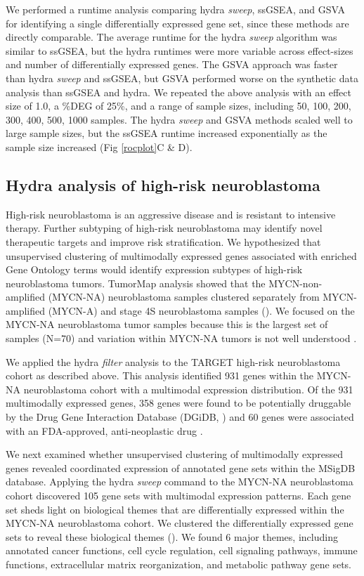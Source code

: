 \documentclass[10pt,letterpaper]{article}
\begin{document}
We performed a runtime analysis comparing hydra \textit{sweep}, ssGSEA, and GSVA for identifying a single differentially expressed gene set, since these methods are directly comparable. The average runtime for the hydra \textit{sweep} algorithm was similar to ssGSEA, but the hydra runtimes were more variable across effect-sizes and number of differentially expressed genes. The GSVA approach was faster than hydra \textit{sweep} and ssGSEA, but GSVA performed worse on the synthetic data analysis than ssGSEA and hydra. We repeated the above analysis with an effect size of 1.0, a \%DEG of 25\%, and a range of sample sizes, including  50, 100, 200, 300, 400, 500, 1000 samples. The hydra \textit{sweep} and GSVA methods scaled well to large sample sizes, but the ssGSEA runtime increased exponentially as the sample size increased (Fig \ref{rocplot}C \& D).

\subsection*{Hydra analysis of high-risk neuroblastoma}
High-risk neuroblastoma is an aggressive disease and is resistant to intensive therapy. Further subtyping of high-risk neuroblastoma may identify novel therapeutic targets and improve risk stratification. We hypothesized that unsupervised clustering of multimodally expressed genes associated with enriched Gene Ontology terms would identify expression subtypes of high-risk neuroblastoma tumors. TumorMap  analysis \cite{newtonTumorMapExploringMolecular2017} showed that the MYCN-non-amplified (MYCN-NA) neuroblastoma samples clustered separately from MYCN-amplified (MYCN-A) and stage 4S neuroblastoma samples (). We focused on the MYCN-NA neuroblastoma tumor samples because this is the largest set of samples (N=70) and variation within MYCN-NA tumors is not well understood \cite{morgensternChallengeDefiningUltrahighrisk2019}.

We applied the hydra \textit{filter} analysis to the TARGET high-risk neuroblastoma cohort as described above. This analysis identified 931 genes within the MYCN-NA neuroblastoma cohort with a multimodal expression distribution. Of the 931 multimodally expressed genes, 358 genes were found to be potentially druggable by the Drug Gene Interaction Database (DGiDB, ) and 60 genes were associated with an FDA-approved, anti-neoplastic drug \cite{cotto2017dgidb}. 

We next examined whether unsupervised clustering of multimodally expressed genes revealed coordinated expression of annotated gene sets within the MSigDB database. Applying the hydra \textit{sweep} command to the MYCN-NA neuroblastoma cohort discovered 105 gene sets with multimodal expression patterns. Each gene set sheds light on biological themes that are differentially expressed within the MYCN-NA neuroblastoma cohort. We clustered the differentially expressed gene sets to reveal these biological themes (). We found 6 major themes, including annotated cancer functions, cell cycle regulation, cell signaling pathways, immune functions, extracellular matrix reorganization, and metabolic pathway gene sets.
\end{document}
